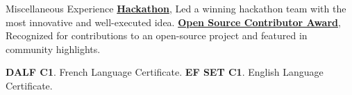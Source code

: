 \begin{rubric}{Miscellaneous Experience}
    \entry*[2023] \textbf{\href{https://github.com/hackathon-tom}{Hackathon}}, Led a winning hackathon team with the most innovative and well-executed idea.
    \entry*[2023] \textbf{\href{https://medusajs.com/blog/community-highlights-3/}{Open Source Contributor Award}}, Recognized for contributions to an open-source project and featured in community highlights.

    \entry*[2024] \textbf{DALF C1}. French Language Certificate.
    \entry*[2024] \textbf{EF SET C1}. English Language Certificate.
\end{rubric}